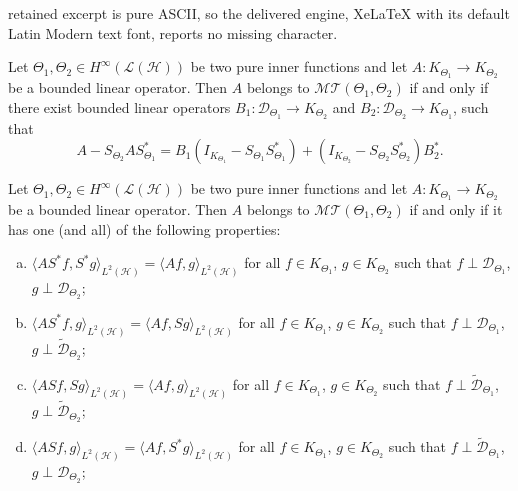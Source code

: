 \documentclass[10pt,a4paper]{amsart}
\newcommand{\dfc}[1]{(I_{K_{\Theta_#1}}\!\!-S_{\Theta_#1}S_{\Theta_#1}^*)}
\newcommand{\hsp}{\mathcal{H}}
\newcommand{\oL }{\mathcal{L}(\hsp) }
\begin{document}
retained excerpt is pure ASCII, so the delivered engine, XeLaTeX with its default Latin Modern text font, reports no missing character.
\begin{theorem}\label{tcara}
	Let $ {\Theta_1},{\Theta_2} \in H^{\infty}(\oL)$ be two pure inner functions and let $A:K_{\Theta_{1}}\rightarrow  K_{\Theta_{2}}$ be a bounded linear operator. Then $A$ belongs to $\mathcal{MT}(\Theta_{1}, \Theta_{2})$  if and only if there exist bounded linear operators \mbox{$B_1:\mathcal{D}_{\Theta_{1}}\to K_{\Theta_{2}}$} and $B_2: \mathcal{D}_{\Theta_{2}}\to K_{\Theta_{1}}$, such that
	\begin{equation}\label{cara}
	A-S_{\Theta_2}AS_{\Theta_1}^*=B_1\dfc{1}+\dfc{2}B_2^*.
	\end{equation}
\end{theorem}

\begin{theorem}
Let $\Theta_1, \Theta_2\in H^\infty(\oL)$ be two pure inner functions and let $A:K_{\Theta_1}\to K_{\Theta_2}$ be a bounded linear operator. Then $A$ belongs to $\mathcal{MT}(\Theta_1, \Theta_2)$ if and only if it has one (and all) of the following properties:
\begin{enumerate}[(a)]
\item $\langle AS^*f, S^*g\rangle_{L^2(\hsp)}=\langle A f,g\rangle_{L^2(\hsp)}$ for all $f\in K_{\Theta_1}$, $g\in K_{\Theta_2}$ such that $f\perp\mathcal{D}_{\Theta_1}$, $g\perp\mathcal{D}_{\Theta_2}$;\label{T1}
    \item $\langle AS^*f, g\rangle_{L^2(\hsp)}=\langle Af,Sg\rangle_{L^2(\hsp)}$ for all $f\in K_{\Theta_1}$, $g\in K_{\Theta_2}$ such that $f\perp\mathcal{D}_{\Theta_1}$, $g\perp\widetilde{\mathcal{D}}_{\Theta_2}$;\label{T2}
    \item $\langle ASf, Sg\rangle_{L^2(\hsp)}=\langle Af,g\rangle_{L^2(\hsp)}$ for all $f\in K_{\Theta_1}$, $g\in K_{\Theta_2}$ such that $f\perp\widetilde{\mathcal{D}}_{\Theta_1}$, $g\perp\widetilde{\mathcal{D}}_{\Theta_2}$;\label{T3}
    \item $\langle ASf, g\rangle_{L^2(\hsp)}=\langle Af,S^*g\rangle_{L^2(\hsp)}$ for all $f\in K_{\Theta_1}$, $g\in K_{\Theta_2}$ such that $f\perp\widetilde{\mathcal{D}}_{\Theta_1}$, $g\perp\mathcal{D}_{\Theta_2}$;\label{T4}
\end{enumerate}
\end{theorem}
\end{document}
